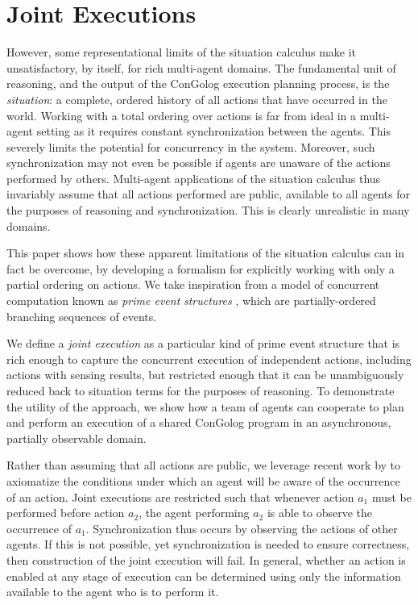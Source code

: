 


\chapter{Joint Executions}

\label{ch:planning}

However, some representational limits of the situation calculus make
it unsatisfactory, by itself, for rich multi-agent domains. The fundamental
unit of reasoning, and the output of the ConGolog execution planning
process, is the \emph{situation}: a complete, ordered history of all
actions that have occurred in the world. Working with a total ordering
over actions is far from ideal in a multi-agent setting as it requires
constant synchronization between the agents. This severely limits
the potential for concurrency in the system. Moreover, such synchronization
may not even be possible if agents are unaware of the actions performed
by others. Multi-agent applications of the situation calculus thus
invariably assume that all actions performed are public, available
to all agents for the purposes of reasoning and synchronization. This
is clearly unrealistic in many domains.

This paper shows how these apparent limitations of the situation calculus
can in fact be overcome, by developing a formalism for explicitly
working with only a partial ordering on actions. We take inspiration
from a model of concurrent computation known as \emph{prime event}
\emph{structures} \citep{npw79event_structures}, which are partially-ordered
branching sequences of events. 

We define a \emph{joint execution} as a particular kind of prime event
structure that is rich enough to capture the concurrent execution
of independent actions, including actions with sensing results, but
restricted enough that it can be unambiguously reduced back to situation
terms for the purposes of reasoning. To demonstrate the utility of
the approach, we show how a team of agents can cooperate to plan and
perform an execution of a shared ConGolog program in an asynchronous,
partially observable domain.

Rather than assuming that all actions are public, we leverage recent
work by \citep{kelly07sc_know_obs} to axiomatize the conditions under
which an agent will be aware of the occurrence of an action. Joint
executions are restricted such that whenever action $a_{1}$ must
be performed before action $a_{2}$, the agent performing $a_{2}$
is able to observe the occurrence of $a_{1}$. Synchronization thus
occurs by observing the actions of other agents. If this is not possible,
yet synchronization is needed to ensure correctness, then construction
of the joint execution will fail. In general, whether an action is
enabled at any stage of execution can be determined using only the
information available to the agent who is to perform it.

